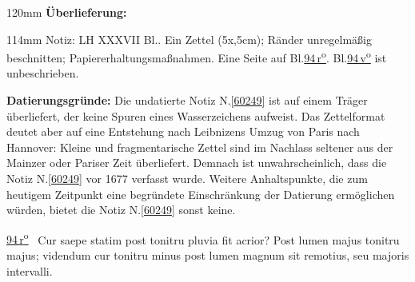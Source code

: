 %
\frenchspacing%
\begin{ledgroupsized}[r]{120mm}%
\footnotesize%
\pstart%
\noindent%
\textbf{Überlieferung:}%
\pend%
\end{ledgroupsized}%
\begin{ledgroupsized}[r]{114mm}%
\footnotesize%
\pstart%
\parindent -6mm%
%
Notiz:
LH XXXVII Bl..
Ein Zettel (5\:x,5\;cm);
Ränder unregelmäßig beschnitten;
Papiererhaltungsmaßnahmen.
Eine Seite auf Bl.\;\href{\Scan{LH_37_04_094r}}{94\,r\textsuperscript{o}}.
Bl.\;\href{\Scan{LH_37_04_094v}}{94\,v\textsuperscript{o}}
ist unbeschrieben.
\pend%
\end{ledgroupsized}%
\vspace{5mm}%
\begin{ledgroup}%
\footnotesize%
\pstart%
\noindent%
\textbf{Datierungsgründe:}
Die undatierte Notiz N.\;\ref{60249} ist auf einem Träger überliefert, der keine Spuren eines Wasserzeichens %
aufweist. %
Das Zettelformat deutet aber auf eine Entstehung %
nach Leibnizens Umzug von Paris nach Hannover:
Kleine und fragmentarische Zettel sind im Nachlass seltener aus der Mainzer oder Pariser Zeit überliefert.
Demnach ist unwahrscheinlich, dass die Notiz N.\;\ref{60249} vor 1677 verfasst wurde.
\pend%
\pstart%
Weitere Anhaltspunkte, die zum heutigem Zeitpunkt eine begründete Einschränkung der Datierung ermöglichen würden, bietet die Notiz N.\;\ref{60249} sonst keine.
\pend%
\end{ledgroup}%
%
\frenchspacing%
\vspace{8mm}%
\normalsize%
\pstart%
\noindent%
\lbrack%
\href{\Scan{LH_37_04_094r}}%
{94\,r\textsuperscript{o}}%
\rbrack\
Cur saepe statim post tonitru%
pluvia fit acrior?%
\pend%
\pstart%
Post lumen majus tonitru majus;%
videndum
cur tonitru minus post lumen magnum sit remotius,%
%
seu majoris intervalli.%
\pend%
\pstart%
\pend%
%
\frenchspacing%
\normalsize%
\newpage%

